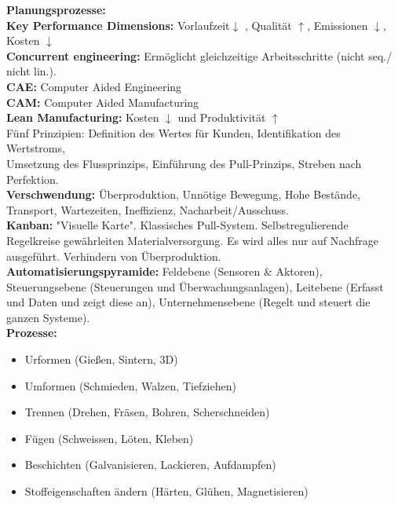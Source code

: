 \textbf{Planungsprozesse:}\\
\textbf{Key Performance Dimensions:} Vorlaufzeit$\downarrow$ , Qualität $\uparrow $, Emissionen $\downarrow $, Kosten $\downarrow $\\
\textbf{Concurrent engineering:} Ermöglicht gleichzeitige Arbeitsschritte (nicht seq./ nicht lin.). \\
\textbf{CAE:} Computer Aided Engineering \\
\textbf{CAM:} Computer Aided Manufacturing \\
\textbf{Lean Manufacturing:} Kosten $\downarrow$ und Produktivität $\uparrow $\\
Fünf Prinzipien: Definition des Wertes für Kunden, Identifikation des Wertstroms, \\Umsetzung des Flussprinzips, Einführung des Pull-Prinzips, Streben nach Perfektion. \\
\textbf{Verschwendung:} Überproduktion, Unnötige Bewegung, Hohe Bestände, Transport, Wartezeiten, Ineffizienz, Nacharbeit/Ausschuss.\\
\textbf{Kanban:} "Visuelle Karte". Klassisches Pull-System. Selbstregulierende Regelkreise gewährleiten Materialversorgung. Es wird alles nur auf Nachfrage ausgeführt. Verhindern von Überproduktion. \\
\textbf{Automatisierungspyramide:} Feldebene (Sensoren \& Aktoren), Steuerungsebene (Steuerungen und Überwachungsanlagen), Leitebene (Erfasst und Daten und zeigt diese an), Unternehmensebene (Regelt und steuert die ganzen Systeme).\\


\textbf{Prozesse:}
\begin{itemize}
    \item Urformen  (Gießen, Sintern, 3D)
    \item Umformen  (Schmieden, Walzen, Tiefziehen)
    \item Trennen (Drehen, Fräsen, Bohren, Scherschneiden)
    \item Fügen (Schweissen, Löten, Kleben)
    \item Beschichten  (Galvanisieren, Lackieren, Aufdampfen)
    \item Stoffeigenschaften ändern  (Härten, Glühen, Magnetisieren)
\end{itemize}
\hspace{0.05\linewidth}

